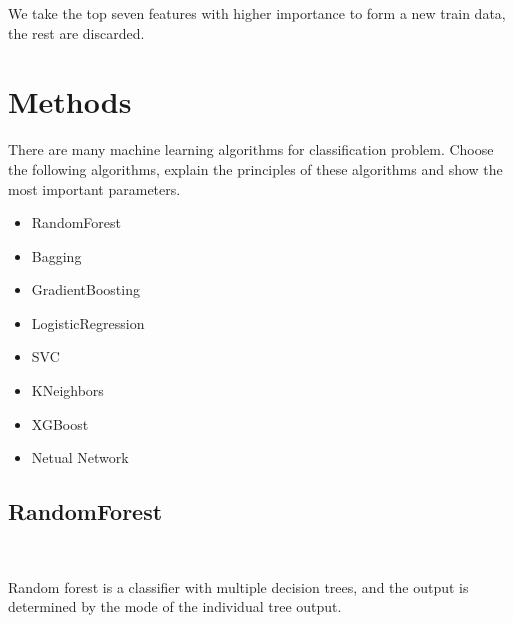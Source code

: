 We take the top seven features 
with higher importance 
to form a new train data, the rest are discarded.


\section{Methods}

There are many machine learning algorithms 
for classification problem. 
Choose the following algorithms, 
explain the principles of
these algorithms and 
show the most important parameters.

\begin{itemize}
	\item RandomForest 
	\item Bagging
	\item GradientBoosting
	\item LogisticRegression
	\item SVC
	\item KNeighbors 
	\item XGBoost
	\item Netual Network
\end{itemize}

\subsection{RandomForest}
\

Random forest is a classifier with 
multiple decision trees, and
the output is determined by 
the mode of the individual tree output.

